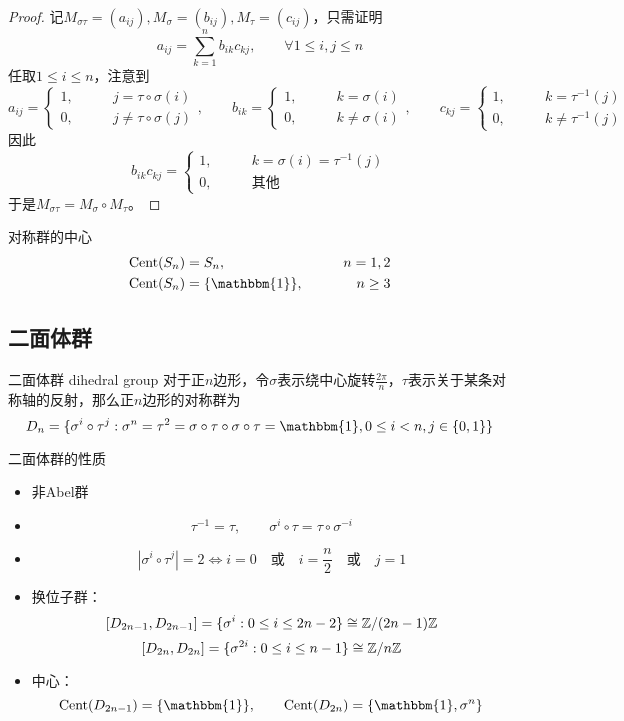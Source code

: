 \begin{proof}
	记$M_{\sigma\tau}=(a_{ij}),M_{\sigma}=(b_{ij}),M_{\tau}=(c_{ij})$，只需证明
	$$
	a_{ij}=\sum_{k=1}^{n}b_{ik}c_{kj},\qquad \forall 1\le i,j\le n
	$$
	任取$1\le i \le n$，注意到
	$$
	a_{ij}=\begin{cases}
		1,\qquad & j=\tau\circ \sigma(i)\\
		0,\qquad & j\ne\tau\circ \sigma(j)
	\end{cases},\qquad b_{ik}=\begin{cases}
		1,\qquad & k=\sigma(i)\\
		0,\qquad & k\ne\sigma(i)
	\end{cases},\qquad 
	c_{kj}=\begin{cases}
		1,\qquad & k=\tau^{-1}(j)\\
		0,\qquad & k\ne\tau^{-1}(j)
	\end{cases}
	$$
	因此
	$$
	b_{ik}c_{kj}=\begin{cases}
		1,\qquad & k=\sigma(i)=\tau^{-1}(j)\\
		0,\qquad & \text{其他}
	\end{cases}
	$$
	于是$M_{\sigma\tau}=M_\sigma\circ M_\tau$。
\end{proof}

\begin{proposition}{对称群的中心}
	\begin{align*}
		&\mathrm{Cent}(S_n)=S_n,\qquad & n=1,2\\
		&\mathrm{Cent}(S_n)=\{ \mathbbm{1} \},\qquad & n\ge 3
	\end{align*}
\end{proposition}

\subsection{二面体群}

\begin{definition}{二面体群 dihedral group}
	对于正$n$边形，令$\sigma$表示绕中心旋转$\frac{2\pi}{n}$，$\tau$表示关于某条对称轴的反射，那么正$n$边形的对称群为
	$$
	D_n=\{ \sigma^i \circ \tau^j:\sigma^n=\tau^2=\sigma \circ \tau \circ \sigma \circ \tau=\mathbbm{1},0\le i <n,j\in\{0,1\} \}
	$$
\end{definition}

\begin{proposition}{二面体群的性质}
	\begin{itemize}
		\item 非Abel群
		\item 
		$$
		\tau^{-1}=\tau,\qquad \sigma^{i}\circ\tau=\tau\circ\sigma^{-i}
		$$
		\item 
		$$
		|\sigma^i\circ\tau^j|=2
		\iff
		i=0
		\quad \text{或} \quad
		i=\frac{n}{2}
		\quad \text{或} \quad
		j=1
		$$
		\item 换位子群：
		$$
		[D_{2n-1},D_{2n-1}]=\{ \sigma^i:0\le i \le 2n-2 \}\cong \mathbb{Z}/(2n-1)\mathbb{Z}
		$$
		$$
		[D_{2n},D_{2n}]=\{ \sigma^{2i}:0\le i\le n-1 \}\cong\mathbb{Z}/n\mathbb{Z}
		$$
		\item 中心：
		$$
		\mathrm{Cent}(D_{2n-1})=\{ \mathbbm{1} \},\qquad 
		\mathrm{Cent}(D_{2n})=\{ \mathbbm{1},\sigma^n \}
		$$
	\end{itemize}
\end{proposition}

